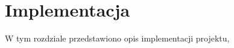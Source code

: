 \chapter{Implementacja}
	
	W tym rozdziale przedstawiono opis implementacji projektu,  


	
	
	
	
	
	
	
	
	
